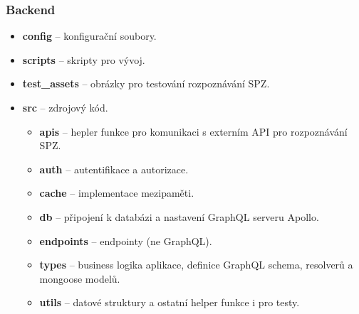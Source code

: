 
\subsubsection*{Backend}

\begin{itemize}
  \setlength\itemsep{.05em}
  \item \textbf{config} -- konfigurační soubory.
  \item \textbf{scripts} -- skripty pro vývoj.
  \item \textbf{test\_assets} -- obrázky pro testování rozpoznávání SPZ.
  \item \textbf{src} -- zdrojový kód.
  \begin{itemize}
    \setlength\itemsep{.05em}
    \item \textbf{apis} -- hepler funkce pro komunikaci s externím API pro rozpoznávání SPZ.
    \item \textbf{auth} -- autentifikace a autorizace.
    \item \textbf{cache} -- implementace mezipaměti.
    \item \textbf{db} -- připojení k databázi a nastavení GraphQL serveru Apollo.
    \item \textbf{endpoints} -- endpointy (ne GraphQL).
    \item \textbf{types} -- business logika aplikace, definice GraphQL schema, resolverů a mongoose modelů.
    \item \textbf{utils} -- datové struktury a ostatní helper funkce i pro testy.
  \end{itemize}
\end{itemize}

